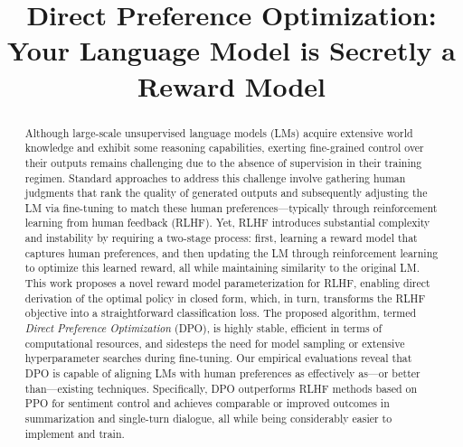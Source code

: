 \title{Direct Preference Optimization: Your Language Model is Secretly a Reward Model}

\begin{abstract}
Although large-scale unsupervised language models (LMs) acquire extensive world knowledge and exhibit some reasoning capabilities, exerting fine-grained control over their outputs remains challenging due to the absence of supervision in their training regimen. Standard approaches to address this challenge involve gathering human judgments that rank the quality of generated outputs and subsequently adjusting the LM via fine-tuning to match these human preferences—typically through reinforcement learning from human feedback (RLHF). Yet, RLHF introduces substantial complexity and instability by requiring a two-stage process: first, learning a reward model that captures human preferences, and then updating the LM through reinforcement learning to optimize this learned reward, all while maintaining similarity to the original LM. This work proposes a novel reward model parameterization for RLHF, enabling direct derivation of the optimal policy in closed form, which, in turn, transforms the RLHF objective into a straightforward classification loss. The proposed algorithm, termed \textit{Direct Preference Optimization} (DPO), is highly stable, efficient in terms of computational resources, and sidesteps the need for model sampling or extensive hyperparameter searches during fine-tuning. Our empirical evaluations reveal that DPO is capable of aligning LMs with human preferences as effectively as—or better than—existing techniques. Specifically, DPO outperforms RLHF methods based on PPO for sentiment control and achieves comparable or improved outcomes in summarization and single-turn dialogue, all while being considerably easier to implement and train.
\end{abstract}

